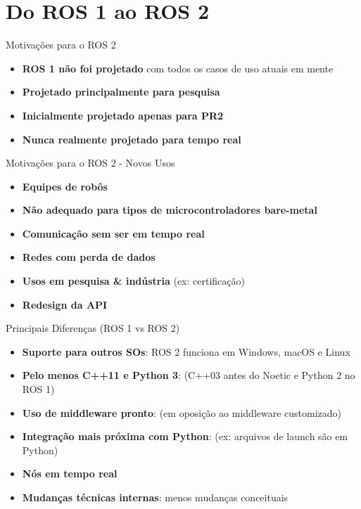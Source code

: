 \section{Do ROS 1 ao ROS 2}
\begin{frame}{Motivações para o ROS 2}
\begin{itemize}
    \item \textbf{ROS 1 não foi projetado} com todos os casos de uso atuais em mente
    \item \textbf{Projetado principalmente para pesquisa}
    \item \textbf{Inicialmente projetado apenas para PR2}
    \item \textbf{Nunca realmente projetado para tempo real}
\end{itemize}
\end{frame}

\begin{frame}{Motivações para o ROS 2 - Novos Usos}
\begin{itemize}
    \item \textbf{Equipes de robôs}
    \item \textbf{Não adequado para tipos de microcontroladores bare-metal}
    \item \textbf{Comunicação sem ser em tempo real}
    \item \textbf{Redes com perda de dados}
    \item \textbf{Usos em pesquisa \& indústria} (ex: certificação)
    \item \textbf{Redesign da API}
\end{itemize}
\end{frame}

\begin{frame}{Principais Diferenças (ROS 1 vs ROS 2)}
\begin{itemize}
  \item \textbf{Suporte para outros SOs}: ROS 2 funciona em Windows, macOS e Linux
  \item \textbf{Pelo menos C++11 e Python 3}: (C++03 antes do Noetic e Python 2 no ROS 1)
  \item \textbf{Uso de middleware pronto}: (em oposição ao middleware customizado)
  \item \textbf{Integração mais próxima com Python}: (ex: arquivos de launch são em Python)
  \item \textbf{Nós em tempo real}
  \item \textbf{Mudanças técnicas internas}: menos mudanças conceituais
\end{itemize}
\end{frame}





